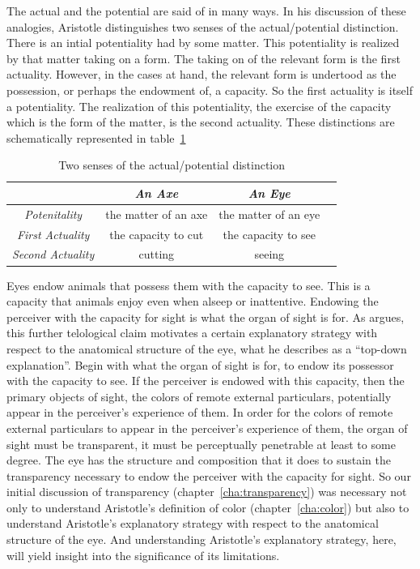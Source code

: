 The actual and the potential are said of in many ways. In his discussion of these analogies, Aristotle distinguishes two senses of the actual/potential distinction. There is an intial potentiality had by some matter. This potentiality is realized by that matter taking on a form. The taking on of the relevant form is the first actuality. However, in the cases at hand, the relevant form is undertood as the possession, or perhaps the endowment of, a capacity. So the first actuality is itself a potentiality. The realization of this potentiality, the exercise of the capacity which is the form of the matter, is the second actuality. These distinctions are schematically represented in table~\ref{tab:potential}

\begin{table}[htbp]
	\centering
		\begin{tabular}{cccc}
			& \emph{An Axe} & \emph{An Eye}\\
			\hline
			\emph{Potenitality} & the matter of an axe & the matter of an eye\\
			\hline
			\emph{First Actuality} & the capacity to cut & the capacity to see\\
			\hline
			\emph{Second Actuality} & cutting & seeing\\
			\hline
		\end{tabular}
	\caption{Two senses of the actual/potential distinction}
	\label{tab:potential}
\end{table}

Eyes endow animals that possess them with the capacity to see. This is a capacity that animals enjoy even when alseep or inattentive. Endowing the perceiver with the capacity for sight is what the organ of sight is for. As \citet{Johansen:1997zr} argues, this further telological claim motivates a certain explanatory strategy with respect to the anatomical structure of the eye, what he describes as a ``top-down explanation''. Begin with what the organ of sight is for, to endow its possessor with the capacity to see. If the perceiver is endowed with this capacity, then the primary objects of sight, the colors of remote external particulars, potentially appear in the perceiver's experience of them. In order for the colors of remote external particulars to appear in the perceiver's experience of them, the organ of sight must be transparent, it must be perceptually penetrable at least to some degree. The eye has the structure and composition that it does to sustain the transparency necessary to endow the perceiver with the capacity for sight. So our initial discussion of transparency (chapter~\ref{cha:transparency}) was necessary not only to understand Aristotle's definition of color (chapter~\ref{cha:color}) but also to understand Aristotle's explanatory strategy with respect to the anatomical structure of the eye. And understanding Aristotle's explanatory strategy, here, will yield insight into the significance of its limitations.



